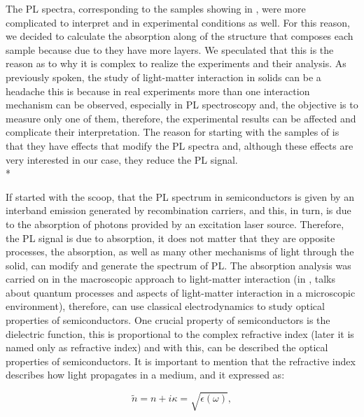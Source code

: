 The PL spectra, corresponding to the samples showing in ,  were more complicated to interpret and in experimental conditions as well. For this reason, we decided to calculate the absorption along of the structure that composes each sample because due to they have more layers. We speculated that this is the reason as to why it is  complex to realize the experiments and their analysis. As previously spoken, the study of light-matter interaction in solids can be a headache this is because in real experiments more than one interaction mechanism can be observed, especially in PL spectroscopy and, the objective is to measure only one of them, therefore, the experimental results can be affected and complicate their interpretation. The reason for starting with the samples of  is that they have effects that modify the PL spectra and, although these effects are very interested in our case, they reduce the PL signal.\\* 

If started with the scoop, that the PL spectrum in semiconductors is given by an interband emission generated by recombination carriers, and this, in turn, is due to the absorption of photons provided by an excitation laser source. Therefore, the PL signal is due to absorption, it does not matter that they are opposite processes, the absorption, as well as many other mechanisms of light through the solid, can modify and generate the spectrum of PL. The absorption analysis was carried on in the macroscopic approach to light-matter interaction (in , talks about quantum processes and aspects of light-matter interaction in a microscopic environment), therefore,   can use classical electrodynamics to study optical properties of semiconductors. One crucial property of semiconductors is the dielectric function, this is proportional to the complex refractive index (later it is named only as refractive index) and with this,  can be described the optical properties of semiconductors. It is important to mention that the refractive index describes how light propagates  in a medium, and it expressed as\cite{chuang1995physics,jimenez2016spectroscopic}:

\begin{equation}
	\tilde{n}=n + i\kappa = \sqrt{\epsilon(\omega)},
	\label{eq:chapter-3-PL-complex-refractive-index}
\end{equation}

